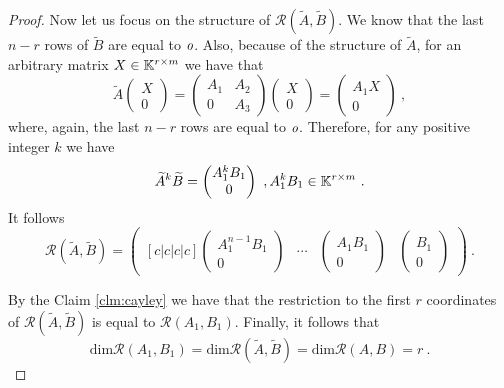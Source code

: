 \begin{proof}
	Now let us focus on the structure of $\mathcal{R}(\widetilde{A},\widetilde{B})$. We know that the last $n-r$ rows of $\widetilde{B}$ are equal to $\textit{o}$. Also, because of the structure of $\widetilde{A}$, for an arbitrary matrix $X\in\mathbb{K}^{r\times m}$ we have that 
	\begin{equation*}
		\widetilde{A}
		\begin{pmatrix}
			X \\
			0
		\end{pmatrix}
		=
		\begin{pmatrix}
			A_1 & A_2 \\
			  0 & A_3
		\end{pmatrix}
		\begin{pmatrix}
			X \\
			0
		\end{pmatrix}
		=
		\begin{pmatrix}
			A_1X \\
			0
		\end{pmatrix}\ ,
	\end{equation*}
	where, again, the last $n-r$ rows are equal to $\textit{o}$. Therefore, for any positive integer $k$ we have 
	\begin{equation*}
		\widetilde{A}^k\widetilde{B}=
		\begin{pmatrix}
			A_1^{k}B_1 \\
			0
        \end{pmatrix}
        \ ,A_1^kB_1\in\mathbb{K}^{r\times m}\ .
    \end{equation*}
    It follows
    \begin{equation*}
        \mathcal{R}(\widetilde{A},\widetilde{B})=
        \begin{pmatrix}[c|c|c|c]
            \begin{pmatrix}
                A_1^{n-1}B_1 \\
                0 
            \end{pmatrix}
            & \cdots &
            \begin{pmatrix}
                A_1B_1 \\
                0 
            \end{pmatrix}
            &
            \begin{pmatrix}
                B_1 \\
                0 
            \end{pmatrix}
        \end{pmatrix}\ .
    \end{equation*}
	
	By the Claim \ref{clm:cayley} we have that the restriction to the first $r$ coordinates of $\mathcal{R}(\widetilde{A},\widetilde{B})$ is equal to $\mathcal{R}(A_1,B_1)$. Finally, it follows that
	$$\text{dim}\mathcal{R}(A_1,B_1)=\text{dim}\mathcal{R}(\widetilde{A},\widetilde{B})=\text{dim}\mathcal{R}(A,B)=r\ .$$
\end{proof}

